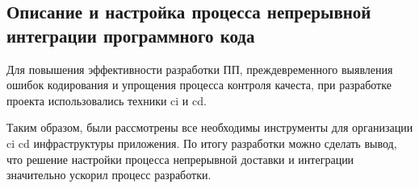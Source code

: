 \subsection{Описание и настройка процесса непрерывной интеграции программного кода}
\label{sec:testing:ci}

Для повышения эффективности разработки ПП, преждевременного выявления ошибок кодирования и упрощения процесса контроля качеста, при разработке проекта использовались техники \gls{ci} и \gls{cd}.







Таким образом, были рассмотрены все необходимы инструменты для организации \gls{ci} \gls{cd} инфраструктуры приложения. По итогу разработки можно сделать вывод, что решение настройки процесса непрерывной доставки и интеграции значительно ускорил процесс разработки.